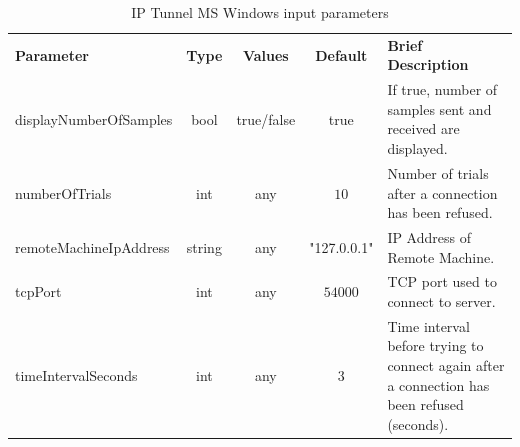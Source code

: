 \begin{table}[h]
	\centering
	\begin{tabular}{|l|c|c|c|p{50mm}|}
		\cline{1-5}
		\textbf{Parameter} & \textbf{Type} & \textbf{Values} &   \textbf{Default}& \textbf{Brief Description} \\ \cline{1-5}
		
        displayNumberOfSamples & bool & true/false & true & If true, number of samples sent and received are displayed.\\ \cline{1-5}
		numberOfTrials & int & any & $10$ & Number of trials after a connection has been refused.\\ \cline{1-5}
		remoteMachineIpAddress & string & any & "127.0.0.1" & IP Address of Remote Machine.\\ \cline{1-5}
		tcpPort & int & any & $54000$ & TCP port used to connect to server.\\ \cline{1-5}
		timeIntervalSeconds & int & any & $3$ & Time interval before trying to connect again after a connection has been refused (seconds).\\ \cline{1-5}
	\end{tabular}
	\caption{IP Tunnel MS Windows input parameters}
	\label{table:ipt_in_par}
\end{table}

%

